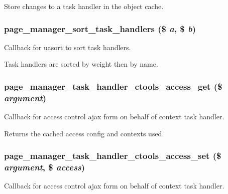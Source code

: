 \label{page__manager_8module_a87718088cd075fb9c3c6884df0e33212}
Store changes to a task handler in the object cache. \hypertarget{page__manager_8module_a40e9b153aba4e968d1053f0eeb321d9c}{
\subsubsection[{page\_\-manager\_\-sort\_\-task\_\-handlers}]{\setlength{\rightskip}{0pt plus 5cm}page\_\-manager\_\-sort\_\-task\_\-handlers (\$ {\em a}, \/  \$ {\em b})}}
\label{page__manager_8module_a40e9b153aba4e968d1053f0eeb321d9c}
Callback for uasort to sort task handlers.

Task handlers are sorted by weight then by name. \hypertarget{page__manager_8module_ad3ef49901d1e2061c124c1580a70cebf}{
\subsubsection[{page\_\-manager\_\-task\_\-handler\_\-ctools\_\-access\_\-get}]{\setlength{\rightskip}{0pt plus 5cm}page\_\-manager\_\-task\_\-handler\_\-ctools\_\-access\_\-get (\$ {\em argument})}}
\label{page__manager_8module_ad3ef49901d1e2061c124c1580a70cebf}
Callback for access control ajax form on behalf of context task handler.

Returns the cached access config and contexts used. \hypertarget{page__manager_8module_a53ad57d493d2eaa1358620d1b50d060c}{
\subsubsection[{page\_\-manager\_\-task\_\-handler\_\-ctools\_\-access\_\-set}]{\setlength{\rightskip}{0pt plus 5cm}page\_\-manager\_\-task\_\-handler\_\-ctools\_\-access\_\-set (\$ {\em argument}, \/  \$ {\em access})}}
\label{page__manager_8module_a53ad57d493d2eaa1358620d1b50d060c}
Callback for access control ajax form on behalf of context task handler.

